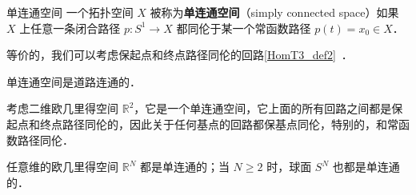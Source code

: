 

\begin{issues}
\issueDraft
\end{issues}


\begin{definition}{单连通空间}\label{SmpCn_def1}
一个拓扑空间 $X$ 被称为\textbf{单连通空间}（simply connected space）如果 $X$ 上任意一条闭合路径 $p: S^1 \to X$ 都同伦于某一个常函数路径 $p(t) = x_0 \in X$．
\end{definition}

等价的，我们可以考虑保起点和终点路径同伦的回路\autoref{HomT3_def2}~．

\begin{theorem}{}
单连通空间是道路连通的．
\end{theorem}

\begin{example}{}
考虑二维欧几里得空间 $\mathbb{R}^2$，它是一个单连通空间，它上面的所有回路之间都是保起点和终点路径同伦的，因此关于任何基点的回路都保基点同伦，特别的，和常函数路径同伦．

任意维的欧几里得空间 $\mathbb{R}^N$ 都是单连通的；当 $N \geq 2$ 时，球面 $S^N$ 也都是单连通的．
\end{example}